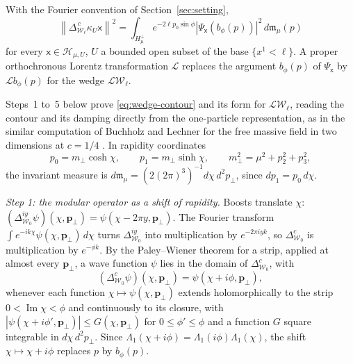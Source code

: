 \documentclass[11pt]{amsart}
\numberwithin{equation}{section}
\theoremstyle{definition}
\newcommand{\Hh}{\mathcal H}
\newcommand{\sx}{\mathsf x}
\newcommand{\bp}{\mathbf p}
\newcommand{\Ima}{\operatorname{Im}}
\newcommand{\norm}[1]{\left\|#1\right\|}
\begin{document}
With the Fourier convention of Section~\ref{sec:setting},
\begin{equation}
 \norm{\Delta_{\mathcal W_\ell}^{\,c}\kappa_U\sx}^2
 =
 \int_{H_\mu^+}e^{-2\ell p_0\sin\phi}
       |\Psi_\sx(b_\phi(p))|^2\,d\mathfrak m_\mu(p)
 \label{eq:wedge-contour}
\end{equation}
for every \(\sx\in\Hh_{\mu,U}\), \(U\) a bounded open subset of the base
\(\{x^1<\ell\}\). A proper orthochronous Lorentz
transformation \(\mathcal L\) replaces the argument \(b_\phi(p)\) of \(\Psi_\sx\) by
\(\mathcal Lb_\phi(p)\) for the wedge \(\mathcal L\mathcal W_\ell\).

Steps~1 to~5 below prove \eqref{eq:wedge-contour} and its form for
\(\mathcal L\mathcal W_\ell\), reading the contour and its damping
directly from the one-particle representation, as in the similar
computation of Buchholz and Lechner for the free massive field in two
dimensions at \(c=1/4\) \cite[Section~4]{BL04}. In rapidity coordinates
\[
 p_0=m_\perp\cosh\chi,\qquad p_1=m_\perp\sinh\chi,\qquad
 m_\perp^2=\mu^2+p_2^2+p_3^2,
\]
the invariant measure is
\(d\mathfrak m_\mu=(2(2\pi)^3)^{-1}d\chi\,d^2p_\perp\), since
\(dp_1=p_0\,d\chi\).

\smallskip
\emph{Step 1: the modular operator as a shift of rapidity.} Boosts
translate \(\chi\):
\((\Delta_{\mathcal W_0}^{iy}\psi)(\chi,\bp_\perp)=\psi(\chi-2\pi y,\bp_\perp)\).
The Fourier transform \(\int e^{-ik\chi}\psi(\chi,\bp_\perp)\,d\chi\) turns
\(\Delta_{\mathcal W_0}^{iy}\) into multiplication by \(e^{-2\pi iyk}\), so
\(\Delta_{\mathcal W_0}^{c}\) is multiplication by \(e^{-\phi k}\). By the
Paley--Wiener theorem for a strip, applied at almost every \(\bp_\perp\), a wave
function \(\psi\) lies in the domain of \(\Delta_{\mathcal W_0}^{c}\), with
\[
 (\Delta_{\mathcal W_0}^{c}\psi)(\chi,\bp_\perp)=\psi(\chi+i\phi,\bp_\perp),
\]
whenever each function \(\chi\mapsto\psi(\chi,\bp_\perp)\) extends
holomorphically to the strip \(0<\Ima\chi<\phi\) and continuously to its
closure, with \(|\psi(\chi+i\phi',\bp_\perp)|\le G(\chi,\bp_\perp)\) for
\(0\le\phi'\le\phi\) and a function \(G\) square integrable in
\(d\chi\,d^2p_\perp\). Since
\(\Lambda_1(\chi+i\phi)=\Lambda_1(i\phi)\Lambda_1(\chi)\), the shift
\(\chi\mapsto\chi+i\phi\) replaces \(p\) by \(b_\phi(p)\).
\end{document}
